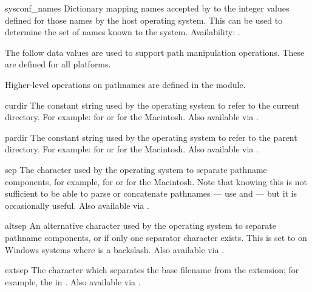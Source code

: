 \begin{datadesc}{sysconf_names}
Dictionary mapping names accepted by  to the
integer values defined for those names by the host operating system.
This can be used to determine the set of names known to the system.
Availability: \UNIX.
\end{datadesc}


The follow data values are used to support path manipulation
operations.  These are defined for all platforms.

Higher-level operations on pathnames are defined in the
 module.


\begin{datadesc}{curdir}
The constant string used by the operating system to refer to the current
directory.
For example:  for \POSIX{} or  for the Macintosh.
Also available via .
\end{datadesc}

\begin{datadesc}{pardir}
The constant string used by the operating system to refer to the parent
directory.
For example:  for \POSIX{} or  for the Macintosh.
Also available via .
\end{datadesc}

\begin{datadesc}{sep}
The character used by the operating system to separate pathname components,
for example, \character{/} for \POSIX{} or \character{:} for the
Macintosh.  Note that knowing this is not sufficient to be able to
parse or concatenate pathnames --- use  and
 --- but it is occasionally useful.
Also available via .
\end{datadesc}

\begin{datadesc}{altsep}
An alternative character used by the operating system to separate pathname
components, or  if only one separator character exists.  This is
set to \character{/} on Windows systems where  is a
backslash.
Also available via .
\end{datadesc}

\begin{datadesc}{extsep}
The character which separates the base filename from the extension;
for example, the  in .
Also available via .
\end{datadesc}

